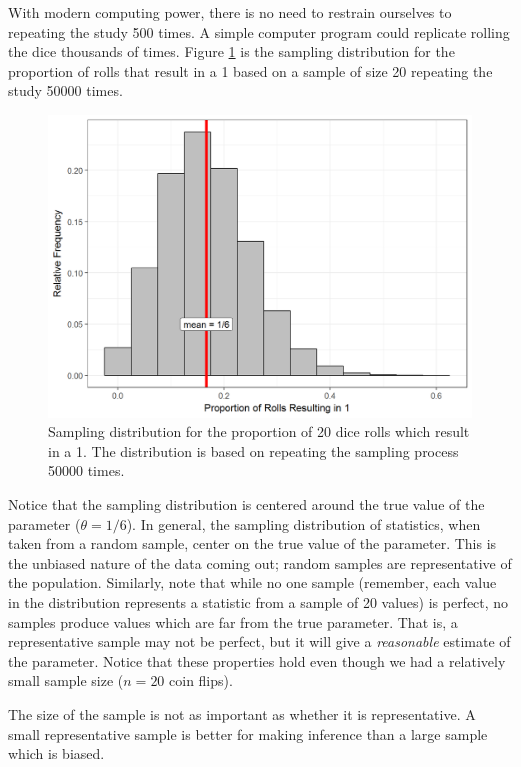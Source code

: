 \documentclass[]{book}
\theoremstyle{definition}
\theoremstyle{definition}
\theoremstyle{remark}
\let\BeginKnitrBlock\begin \let\EndKnitrBlock\end
\begin{document}
With modern computing power, there is no need to restrain ourselves to
repeating the study 500 times. A simple computer program could replicate
rolling the dice thousands of times. Figure
\ref{fig:samplingdistns-dice-histogram} is the sampling distribution for
the proportion of rolls that result in a 1 based on a sample of size 20
repeating the study 50000 times.

\begin{figure}

{\centering \includegraphics[width=0.8\linewidth]{./Images/samplingdistns-dice-histogram-1} 

}

\caption{Sampling distribution for the proportion of 20 dice rolls which result in a 1.  The distribution is based on repeating the sampling process 50000 times.}\label{fig:samplingdistns-dice-histogram}
\end{figure}

Notice that the sampling distribution is centered around the true value
of the parameter (\(\theta = 1/6\)). In general, the sampling
distribution of statistics, when taken from a random sample, center on
the true value of the parameter. This is the unbiased nature of the data
coming out; random samples are representative of the population.
Similarly, note that while no one sample (remember, each value in the
distribution represents a statistic from a sample of 20 values) is
perfect, no samples produce values which are far from the true
parameter. That is, a representative sample may not be perfect, but it
will give a \emph{reasonable} estimate of the parameter. Notice that
these properties hold even though we had a relatively small sample size
(\(n = 20\) coin flips).

\BeginKnitrBlock{rmdkeyidea}
The size of the sample is not as important as whether it is
representative. A small representative sample is better for making
inference than a large sample which is biased.
\EndKnitrBlock{rmdkeyidea}
\end{document}
